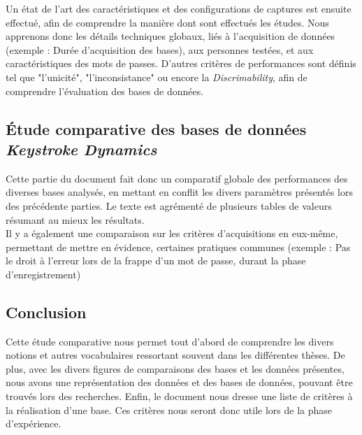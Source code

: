 Un état de l'art des caractéristiques et des configurations de captures est ensuite effectué, afin de comprendre la manière dont sont effectués les études. Nous apprenons donc les détails techniques globaux, liés à l'acquisition de données (exemple : Durée d'acquisition des bases), aux personnes testées, et aux caractéristiques des mots de passes. D'autres critères de performances sont  définis tel que "l'unicité", "l'inconsistance" ou encore la \textit{Discrimability}, afin de comprendre l'évaluation des bases de données.

\subsection{Étude comparative des bases de données \textit{Keystroke Dynamics}}

Cette partie du document fait donc un comparatif globale des performances des diverses bases analysés, en mettant en conflit les divers paramètres présentés lors des précédente parties. Le texte est agrémenté de plusieurs tables de valeurs résumant au mieux les résultats.\\

Il y a également une comparaison sur les critères d'acquisitions en eux-même, permettant de mettre en évidence, certaines pratiques communes (exemple : Pas le droit à l'erreur lors de la frappe d'un mot de passe, durant la phase d'enregistrement)

\subsection{Conclusion}

Cette étude comparative nous permet tout d'abord de comprendre les divers notions et autres vocabulaires ressortant souvent dans les différentes thèses. De plus, avec les divers figures de comparaisons des bases et les données présentes, nous avons une représentation des données et des bases de données, pouvant être trouvés lors des recherches. Enfin, le document nous dresse une liste de critères à la réalisation d'une base. Ces critères nous seront donc utile lors de la phase d'expérience.
